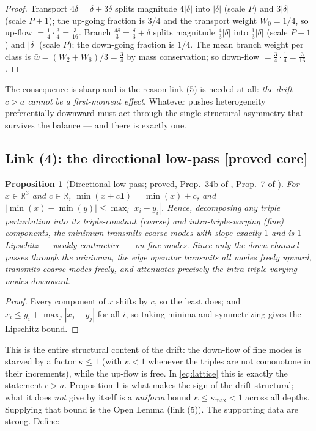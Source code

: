 \documentclass[11pt]{article}
\newtheorem{proposition}[theorem]{Proposition}
\theoremstyle{definition}
\theoremstyle{remark}
\newcommand{\R}{\mathbb{R}}
\newcommand{\kap}{\kappa}
\begin{document}
\begin{proof}
Transport $4\delta = \delta + 3\delta$ splits magnitude $4|\delta|$ into
$|\delta|$ (scale $P$) and $3|\delta|$ (scale $P+1$); the up-going fraction is
$3/4$ and the transport weight $W_0 = 1/4$, so up-flow $= \tfrac14 \cdot
\tfrac34 = \tfrac{3}{16}$. Branch $\tfrac{4\delta}{3} = \tfrac{\delta}{3} +
\delta$ splits magnitude $\tfrac43|\delta|$ into $\tfrac13|\delta|$ (scale
$P-1$) and $|\delta|$ (scale $P$); the down-going fraction is $1/4$. The mean
branch weight per class is $\bar w = (W_2 + W_8)/3 = \tfrac34$ by mass
conservation; so down-flow $= \tfrac34 \cdot \tfrac14 = \tfrac{3}{16}$.
\end{proof}

The consequence is sharp and is the reason link (5) is needed at all:
\emph{the drift $c > a$ cannot be a first-moment effect}. Whatever pushes
heterogeneity preferentially downward must act through the single structural
asymmetry that survives the balance --- and there is exactly one.

\subsection{Link (4): the directional low-pass
\textnormal{[proved core]}}
\label{sec:link4}

\begin{proposition}[Directional low-pass; proved, Prop.~34b of \cite{NOTE},
Prop.~7 of \cite{Drift26}]\label{prop:lowpass}
For $x \in \R^3$ and $c \in \R$, $\min(x + c\mathbf 1) = \min(x) + c$, and
$|\min(x) - \min(y)| \leq \max_i |x_i - y_i|$. Hence, decomposing any triple
perturbation into its triple-constant (coarse) and intra-triple-varying (fine)
components, the minimum transmits coarse modes with slope exactly $1$ and is
$1$-Lipschitz --- weakly contractive --- on fine modes. Since only the
down-channel passes through the minimum, the edge operator transmits all modes
freely upward, transmits coarse modes freely, and attenuates precisely the
intra-triple-varying modes downward.
\end{proposition}

\begin{proof}
Every component of $x$ shifts by $c$, so the least does; and $x_i \leq y_i +
\max_j|x_j - y_j|$ for all $i$, so taking minima and symmetrizing gives the
Lipschitz bound.
\end{proof}

This is the entire structural content of the drift: the down-flow of fine modes
is starved by a factor $\kap \leq 1$ (with $\kap < 1$ whenever the triples are
not comonotone in their increments), while the up-flow is free. In
\eqref{eq:lattice} this is exactly the statement $c > a$. Proposition
\ref{prop:lowpass} is what makes the sign of the drift structural; what it does
\emph{not} give by itself is a \emph{uniform} bound $\kap \leq \kap_{\max} < 1$
across all depths. Supplying that bound is the Open Lemma (link (5)). The
supporting data are strong. Define:
\end{document}
